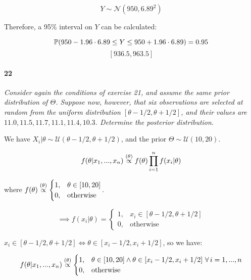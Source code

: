             \[
                Y \sim \mathcal{N}(950, 6.89^2)
            \]

            Therefore, a 95\% interval on $Y$ can be calculated:

            \[
                \mathbb{P}(950 - 1.96 \cdot 6.89 \leq Y \leq 950 + 1.96 \cdot
                6.89) = 0.95
            \]
            \[
                [936.5, 963.5]
            \]

        \paragraph{22}
        \textit{Consider again the conditions of exercise 21, and assume the
        same prior distribution of $\Theta$. Suppose now, however, that six
        observations are selected at random from the uniform distribution
        $[\theta - 1/2, \theta + 1/2]$, and their values are $11.0, 11.5,
        11.7, 11.1, 11.4, 10.3$. Determine the posterior distribution}.

            We have $X_i | \theta \sim \mathcal{U}(\theta - 1/2, \theta +
            1/2)$, and the prior $\Theta \sim \mathcal{U}(10, 20)$.

            \[
                f(\theta | x_1, ..., x_n) \stackrel{({\theta})}{\propto} f(\theta)
                \prod_{i=1}^n f(x_i | \theta)
            \]

            where $f(\theta) \stackrel{({\theta})}{\propto} \begin{cases}1, & \theta \in
            [10, 20] \\ 0, &\text{otherwise}\end{cases}$.

            \[
                \implies f(x_i | \theta) = \begin{cases}1, & x_i \in [\theta
                - 1/2, \theta + 1/2] \\ 0, & \text{otherwise}\end{cases}
            \]

            $x_i \in [\theta - 1/2, \theta + 1/2] \iff \theta \in [x_i -
            1/2, x_i + 1/2]$, so we have:

            \[
                f(\theta | x_1, ..., x_n) \stackrel{({\theta})}{\propto} \begin{cases}1, &
                \theta \in [10, 20] \land \theta \in [x_i - 1/2, x_i + 1/2]
                \,\,\forall\, i = 1, ..., n \\ 0, & \text{otherwise}\end{cases}
            \]

